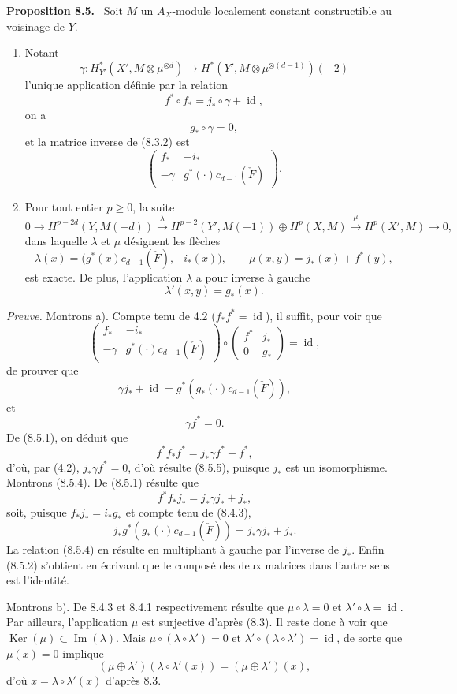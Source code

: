 \documentclass[11pt]{article}
\newenvironment{statement}[1]{\par\medskip\noindent\textbf{#1.}\ }{\par\medskip}
\providecommand{\Ker}{\operatorname{Ker}}
\providecommand{\Ker}{\operatorname{Ker}}
\providecommand{\Ker}{\operatorname{Ker}}
\begin{document}
\begin{statement}{Proposition 8.5}
Soit $M$ un $A_X$-module localement constant constructible au voisinage de $Y$.
\begin{enumerate}[label=\alph*)]
\item Notant
\[
\gamma:H_{Y'}^*(X',M\otimes\mu^{\otimes d})\to
H^*(Y',M\otimes\mu^{\otimes(d-1)})(-2)
\]
l'unique application définie par la relation
\[
f^*\circ f_* = j_*\circ\gamma+\operatorname{id},
\tag{8.5.1}
\]
on a
\[
g_*\circ\gamma=0,
\tag{8.5.2}
\]
et la matrice inverse de (8.3.2) est
\[
\begin{pmatrix}
f_*&-i_*\\
-\gamma&g^*(\cdot)c_{d-1}(\check F)
\end{pmatrix}.
\tag{8.5.3}
\]
\item Pour tout entier $p\ge0$, la suite
\[
0\to H^{p-2d}(Y,M(-d))
\xrightarrow{\lambda}
H^{p-2}(Y',M(-1))\oplus H^p(X,M)
\xrightarrow{\mu}
H^p(X',M)\to0,
\]
dans laquelle $\lambda$ et $\mu$ désignent les flèches
\[
\lambda(x)=\bigl(g^*(x)c_{d-1}(\check F),-i_*(x)\bigr),
\qquad
\mu(x,y)=j_*(x)+f^*(y),
\]
est exacte. De plus, l'application $\lambda$ a pour inverse à gauche
\[
\lambda'(x,y)=g_*(x).
\]
\end{enumerate}
\end{statement}

\emph{Preuve.} Montrons a). Compte tenu de 4.2 ($f_*f^*=\operatorname{id}$), il suffit, pour voir que
\[
\begin{pmatrix}
f_*&-i_*\\
-\gamma&g^*(\cdot)c_{d-1}(\check F)
\end{pmatrix}
\circ
\begin{pmatrix}
f^*&j_*\\
0&g_*
\end{pmatrix}
=\operatorname{id},
\]
de prouver que
\[
\gamma j_*+\operatorname{id}=g^*(g_*(\cdot)c_{d-1}(\check F)),
\tag{8.5.4}
\]
et
\[
\gamma f^*=0.
\tag{8.5.5}
\]
De (8.5.1), on déduit que
\[
f^*f_*f^*=j_*\gamma f^*+f^*,
\]
d'où, par (4.2), $j_*\gamma f^*=0$, d'où résulte (8.5.5), puisque $j_*$ est un isomorphisme. Montrons (8.5.4). De (8.5.1) résulte que
\[
f^*f_*j_*=j_*\gamma j_*+j_*,
\]
soit, puisque $f_*j_*=i_*g_*$ et compte tenu de (8.4.3),
\[
j_*g^*(g_*(\cdot)c_{d-1}(\check F))=j_*\gamma j_*+j_*.
\]
La relation (8.5.4) en résulte en multipliant à gauche par l'inverse de $j_*$. Enfin (8.5.2) s'obtient en écrivant que le composé des deux matrices dans l'autre sens est l'identité.

Montrons b). De 8.4.3 et 8.4.1 respectivement résulte que $\mu\circ\lambda=0$ et $\lambda'\circ\lambda=\operatorname{id}$. Par ailleurs, l'application $\mu$ est surjective d'après (8.3). Il reste donc à voir que $\Ker(\mu)\subset\operatorname{Im}(\lambda)$. Mais $\mu\circ(\lambda\circ\lambda')=0$ et $\lambda'\circ(\lambda\circ\lambda')=\operatorname{id}$, de sorte que $\mu(x)=0$ implique
\[
(\mu\oplus\lambda')(\lambda\circ\lambda'(x))=(\mu\oplus\lambda')(x),
\]
d'où $x=\lambda\circ\lambda'(x)$ d'après 8.3.
\end{document}
